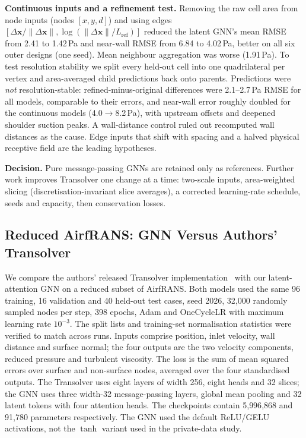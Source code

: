 \documentclass[journal]{IEEEtran}
\begin{document}
\textbf{Continuous inputs and a refinement test.} Removing the raw cell area
from node inputs (nodes $[x,y,d]$) and using edges
$[\Delta\mathbf{x}/\|\Delta\mathbf{x}\|,\log(\|\Delta\mathbf{x}\|/L_\mathrm{ref})]$
reduced the latent GNN's mean RMSE from 2.41 to 1.42\,Pa and near-wall RMSE from
6.84 to 4.02\,Pa, better on all six outer designs (one seed). Mean neighbour
aggregation was worse (1.91\,Pa). To test resolution stability we split every
held-out cell into one quadrilateral per vertex and area-averaged child
predictions back onto parents. Predictions were \emph{not} resolution-stable:
refined-minus-original differences were 2.1--2.7\,Pa RMSE for all models,
comparable to their errors, and near-wall error roughly doubled for the
continuous models (4.0$\to$8.2\,Pa), with upstream offsets and deepened shoulder
suction peaks. A wall-distance control ruled out recomputed wall distances as
the cause. Edge inputs that shift with spacing and a halved physical receptive
field are the leading hypotheses.

\textbf{Decision.} Pure message-passing GNNs are retained only as references.
Further work improves Transolver one change at a time: two-scale inputs,
area-weighted slicing (discretisation-invariant slice averages), a corrected
learning-rate schedule, seeds and capacity, then conservation losses.

\subsection{Reduced AirfRANS: GNN Versus Authors' Transolver}
\label{sec:airfrans}
We compare the authors' released Transolver implementation~\cite{wu2024transolver}
with our latent-attention GNN on a reduced subset of AirfRANS. Both models used
the same 96 training, 16 validation and 40 held-out test cases, seed 2026,
32{,}000 randomly sampled nodes per step, 398 epochs, Adam and OneCycleLR with
maximum learning rate $10^{-3}$. The split lists and training-set normalisation
statistics were verified to match across runs. Inputs comprise position, inlet
velocity, wall distance and surface normal; the four outputs are the two velocity
components, reduced pressure and turbulent viscosity. The loss is the sum of
mean squared errors over surface and non-surface nodes, averaged over the four
standardised outputs. The Transolver uses eight layers of width 256, eight heads
and 32 slices; the GNN uses three width-32 message-passing layers, global mean
pooling and 32 latent tokens with four attention heads. The checkpoints contain
5{,}996{,}868 and 91{,}780 parameters respectively. The GNN used the default
ReLU/GELU activations, not the $\tanh$ variant used in the private-data study.
\end{document}
